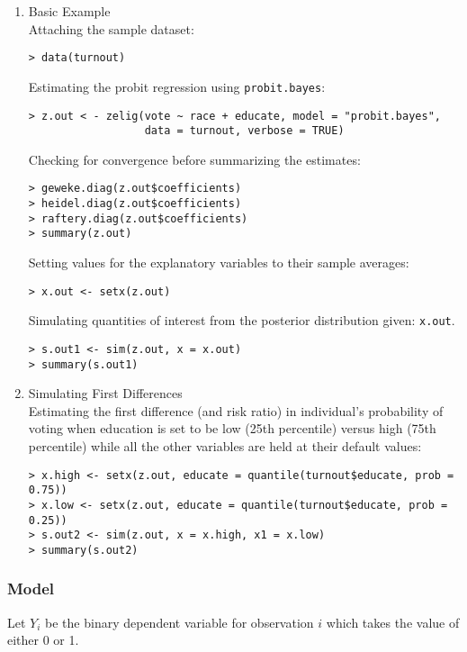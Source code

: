 \begin{enumerate}
\item {Basic Example} \\
Attaching the sample  dataset:
\begin{verbatim}
> data(turnout)
\end{verbatim}
Estimating the probit regression using \texttt{probit.bayes}:
\begin{verbatim}
> z.out < - zelig(vote ~ race + educate, model = "probit.bayes",
                  data = turnout, verbose = TRUE)
\end{verbatim}
Checking for convergence before summarizing the estimates:
\begin{verbatim}
> geweke.diag(z.out$coefficients)
> heidel.diag(z.out$coefficients)
> raftery.diag(z.out$coefficients)
> summary(z.out)
\end{verbatim} %
Setting values for the explanatory variables to their sample averages:
\begin{verbatim}
> x.out <- setx(z.out)
\end{verbatim}
Simulating quantities of interest from the posterior distribution given:
\texttt{x.out}.
\begin{verbatim}
> s.out1 <- sim(z.out, x = x.out)
> summary(s.out1)
\end{verbatim}
\item {Simulating First Differences} \\
Estimating the first difference (and risk ratio) in individual's probability of
voting  when education is set to be low (25th percentile) versus 
high (75th percentile) while all the other variables are held at their 
default values:
\begin{verbatim}
> x.high <- setx(z.out, educate = quantile(turnout$educate, prob = 0.75))
> x.low <- setx(z.out, educate = quantile(turnout$educate, prob = 0.25))
> s.out2 <- sim(z.out, x = x.high, x1 = x.low)
> summary(s.out2)
\end{verbatim}
\end{enumerate}

\subsubsection{Model}

Let $Y_{i}$ be the binary dependent variable for observation $i$ which
takes the value of either 0 or 1.

